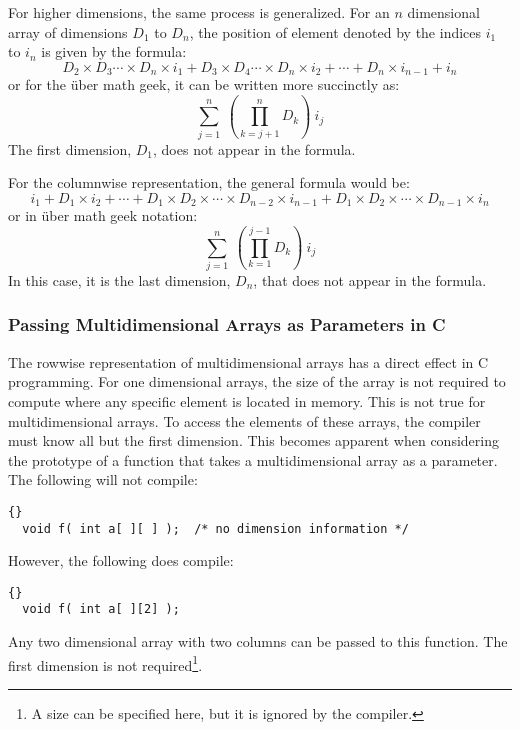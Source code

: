 For higher dimensions, the same process is generalized. For an $n$ dimensional
array of dimensions $D_1$ to $D_n$, the position of element denoted by the
indices $i_1$ to $i_n$ is given by the formula:
\begin{displaymath}
D_2 \times D_3 \cdots \times D_n \times i_1 + D_3 \times D_4 \cdots \times D_n 
\times i_2 + \cdots + D_n \times i_{n-1} + i_n
\end{displaymath}
or for the \"{u}ber math geek, it can be written more succinctly as:
\begin{displaymath}
\sum_{j=1}^{n} \: \left( \prod_{k=j+1}^{n} D_k \right) \: i_j
\end{displaymath}
The first dimension, $D_1$, does not appear in the formula.

For the columnwise representation, the general formula would be:
\begin{displaymath}
i_1 + D_1 \times i_2 + \cdots + D_1 \times D_2 \times \cdots \times D_{n-2} 
\times i_{n-1} + D_1 \times D_2 \times \cdots \times D_{n-1} \times i_n
\end{displaymath}
or in \"{u}ber math geek notation:
\begin{displaymath}
\sum_{j=1}^{n} \: \left( \prod_{k=1}^{j-1} D_k \right) \: i_j
\end{displaymath}
In this case, it is the last dimension, $D_n$, that does not appear in the
formula.

\subsubsection{Passing Multidimensional Arrays as Parameters in C}

The rowwise representation of multidimensional arrays has a direct
effect in C programming. For one dimensional arrays, the size of the
array is not required to compute where any specific element is located
in memory. This is not true for multidimensional arrays.  To access
the elements of these arrays, the compiler must know all but the first
dimension. This becomes apparent when considering the prototype of a
function that takes a multidimensional array as a parameter. The
following will not compile:
\begin{lstlisting}[stepnumber=0]{}
  void f( int a[ ][ ] );  /* no dimension information */
\end{lstlisting}
However, the following does compile:
\begin{lstlisting}[stepnumber=0]{}
  void f( int a[ ][2] );
\end{lstlisting}
Any two dimensional array with two columns can be passed to this function.
The first dimension is not required\footnote{A size can be specified here,
but it is ignored by the compiler.}.

